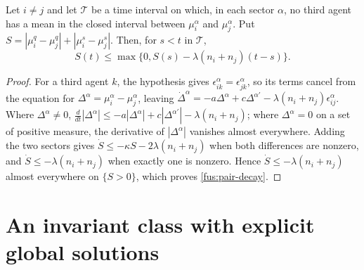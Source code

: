 Let $i\neq j$ and let $\mathcal T$ be a time interval on which, in each
sector $\alpha$, no third agent has a mean in the closed interval between
$\mu_i^\alpha$ and $\mu_j^\alpha$. Put
$S=|\mu_i^q-\mu_j^q|+|\mu_i^s-\mu_j^s|$. Then, for $s<t$ in $\mathcal T$,
\begin{equation}
 S(t)\leq\max\{0,S(s)-\lambda(n_i+n_j)(t-s)\}.
 \label{fus:pair-decay}
\end{equation}
\begin{proof}
For a third agent $k$, the hypothesis gives
$\epsilon_{ik}^\alpha=\epsilon_{jk}^\alpha$, so its terms cancel from the
equation for $\Delta^\alpha=\mu_i^\alpha-\mu_j^\alpha$, leaving
$\dot\Delta^\alpha=-a\Delta^\alpha+c\Delta^{\alpha'}
-\lambda(n_i+n_j)\epsilon_{ij}^\alpha$. Where $\Delta^\alpha\neq0$,
$\frac{d}{dt}|\Delta^\alpha|\leq-a|\Delta^\alpha|+c|\Delta^{\alpha'}|
-\lambda(n_i+n_j)$; where $\Delta^\alpha=0$ on a set of positive measure,
the derivative of $|\Delta^\alpha|$ vanishes almost everywhere. Adding the
two sectors gives $\dot S\leq-\kappa S-2\lambda(n_i+n_j)$ when both
differences are nonzero, and $\dot S\leq-\lambda(n_i+n_j)$ when exactly one
is nonzero. Hence $\dot S\leq-\lambda(n_i+n_j)$ almost everywhere on
$\{S>0\}$, which proves \cref{fus:pair-decay}.
\end{proof}

\section{An invariant class with explicit global solutions}

